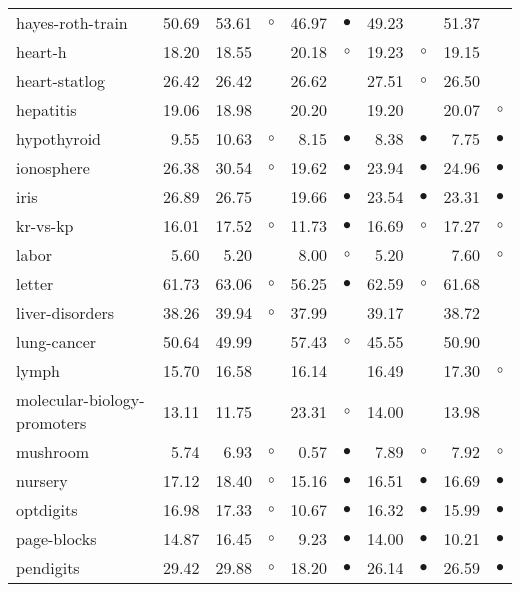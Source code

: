 {\begin{longtable}{lrr@{\hspace{0.1cm}}cr@{\hspace{0.1cm}}cr@{\hspace{0.1cm}}cr@{\hspace{0.1cm}}c}
hayes-roth-train & 50.69 & 53.61 &   $\circ$ & 46.97 &  $\bullet$ & 49.23 &            & 51.37 &           \\
heart-h & 18.20 & 18.55 &           & 20.18 &    $\circ$ & 19.23 &    $\circ$ & 19.15 &           \\
heart-statlog & 26.42 & 26.42 &           & 26.62 &            & 27.51 &    $\circ$ & 26.50 &           \\
hepatitis & 19.06 & 18.98 &           & 20.20 &            & 19.20 &            & 20.07 &    $\circ$\\
hypothyroid &  9.55 & 10.63 &   $\circ$ &  8.15 &  $\bullet$ &  8.38 &  $\bullet$ &  7.75 &  $\bullet$\\
ionosphere & 26.38 & 30.54 &   $\circ$ & 19.62 &  $\bullet$ & 23.94 &  $\bullet$ & 24.96 &  $\bullet$\\
iris & 26.89 & 26.75 &           & 19.66 &  $\bullet$ & 23.54 &  $\bullet$ & 23.31 &  $\bullet$\\
kr-vs-kp & 16.01 & 17.52 &   $\circ$ & 11.73 &  $\bullet$ & 16.69 &    $\circ$ & 17.27 &    $\circ$\\
labor &  5.60 &  5.20 &           &  8.00 &    $\circ$ &  5.20 &            &  7.60 &    $\circ$\\
letter & 61.73 & 63.06 &   $\circ$ & 56.25 &  $\bullet$ & 62.59 &    $\circ$ & 61.68 &           \\
liver-disorders & 38.26 & 39.94 &   $\circ$ & 37.99 &            & 39.17 &            & 38.72 &           \\
lung-cancer & 50.64 & 49.99 &           & 57.43 &    $\circ$ & 45.55 &            & 50.90 &           \\
lymph & 15.70 & 16.58 &           & 16.14 &            & 16.49 &            & 17.30 &    $\circ$\\
molecular-biology-promoters & 13.11 & 11.75 &           & 23.31 &    $\circ$ & 14.00 &            & 13.98 &           \\
mushroom &  5.74 &  6.93 &   $\circ$ &  0.57 &  $\bullet$ &  7.89 &    $\circ$ &  7.92 &    $\circ$\\
nursery & 17.12 & 18.40 &   $\circ$ & 15.16 &  $\bullet$ & 16.51 &  $\bullet$ & 16.69 &  $\bullet$\\
optdigits & 16.98 & 17.33 &   $\circ$ & 10.67 &  $\bullet$ & 16.32 &  $\bullet$ & 15.99 &  $\bullet$\\
page-blocks & 14.87 & 16.45 &   $\circ$ &  9.23 &  $\bullet$ & 14.00 &  $\bullet$ & 10.21 &  $\bullet$\\
pendigits & 29.42 & 29.88 &   $\circ$ & 18.20 &  $\bullet$ & 26.14 &  $\bullet$ & 26.59 &  $\bullet$\\

\end{longtable}}
